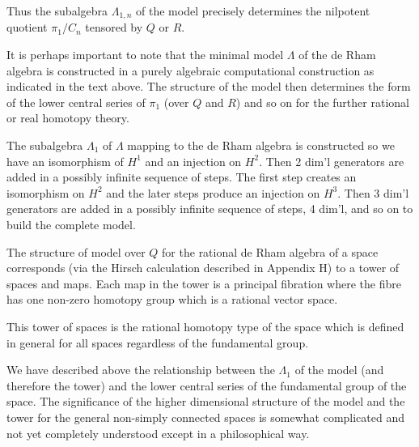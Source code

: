 Thus the subalgebra $\Lambda_{1,n}$ of the model precisely determines the nilpotent quotient $\pi_1/C_n$ tensored by $Q$ or $R$.

It is perhaps important to note that the minimal model $\Lambda$ of the de Rham algebra is constructed in a purely algebraic computational construction as indicated in the text above. The structure of the model then determines the form of the lower central series of $\pi_1$ (over $Q$ and $R$) and so on for the further rational or real homotopy theory.

The subalgebra $\Lambda_1$ of $\Lambda$ mapping to the de Rham algebra is constructed so we have an isomorphism of $H^1$ and an injection on $H^2$. Then 2 dim'l generators are added in a possibly infinite sequence of steps. The first step creates an isomorphism on $H^2$ and the later steps produce an injection on $H^3$. Then 3 dim'l generators are added in a possibly infinite sequence of steps, 4 dim'l, and so on to build the complete model.

The structure of model over $Q$ for the rational de Rham algebra of a space corresponds (via the Hirsch calculation described in Appendix H) to a tower of spaces and maps. Each map in the tower is a principal fibration where the fibre has one non-zero homotopy group which is a rational vector space.

This tower of spaces is the rational homotopy type of the space which is defined in general for all spaces regardless of the fundamental group.

We have described above the relationship between the $\Lambda_1$ of the model (and therefore the tower) and the lower central series of the fundamental group of the space. The significance of the higher dimensional structure of the model and the tower for the general non-simply connected spaces is somewhat complicated and not yet completely understood except in a philosophical way.


